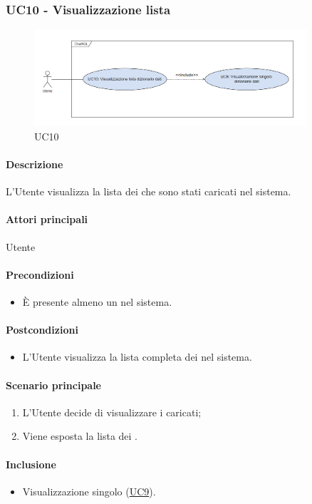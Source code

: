 \subsubsection{UC10 - Visualizzazione lista }\label{UC10}

\begin{figure}[H]
  \centering
  \includegraphics[width=0.90\textwidth]{assets/uc10.png}
  \caption{UC10}
\end{figure}

\paragraph*{Descrizione}
L’Utente visualizza la lista dei  che sono stati caricati nel sistema.

\paragraph*{Attori principali}
Utente

\paragraph*{Precondizioni}
\begin{itemize}
  \item È presente almeno un  nel sistema.  
\end{itemize}

\paragraph*{Postcondizioni}
\begin{itemize}
  \item L’Utente visualizza la lista completa dei  nel sistema.
\end{itemize}

\paragraph*{Scenario principale}
\begin{enumerate}
  \item L’Utente decide di visualizzare i  caricati;
  \item Viene esposta la lista dei .
\end{enumerate}

\paragraph*{Inclusione}
\begin{itemize}
  \item Visualizzazione singolo  (\hyperref[UC9]{UC9}).
\end{itemize}

